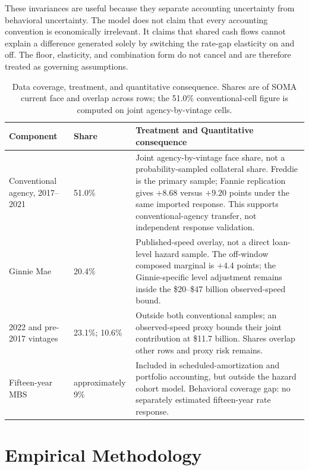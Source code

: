 These invariances are useful because they separate accounting uncertainty from behavioral uncertainty. The model does not claim that every accounting convention is economically irrelevant. It claims that shared cash flows cannot explain a difference generated solely by switching the rate-gap elasticity on and off. The floor, elasticity, and combination form do not cancel and are therefore treated as governing assumptions.

\begin{table}[H]
\centering
\small
\caption{Data coverage, treatment, and quantitative consequence. Shares are of SOMA current face and overlap across rows; the 51.0\% conventional-cell figure is computed on joint agency-by-vintage cells.}
\label{tab:coverage}\label{tab:bases}
\begin{tabular}{@{}p{3.1cm}p{2.3cm}p{9.3cm}@{}}
\toprule
Component & Share & Treatment and Quantitative consequence \\
\midrule
Conventional agency, 2017--2021 & 51.0\% & Joint agency-by-vintage face share, not a probability-sampled collateral share. Freddie is the primary sample; Fannie replication gives $+8.68$ versus $+9.20$ points under the same imported response. This supports conventional-agency transfer, not independent response validation. \\
Ginnie Mae & 20.4\% & Published-speed overlay, not a direct loan-level hazard sample. The off-window composed marginal is $+4.4$ points; the Ginnie-specific level adjustment remains inside the \$20--\$47 billion observed-speed bound. \\
2022 and pre-2017 vintages & 23.1\%; 10.6\% & Outside both conventional samples; an observed-speed proxy bounds their joint contribution at \$11.7 billion. Shares overlap other rows and proxy risk remains. \\
Fifteen-year MBS & approximately 9\% & Included in scheduled-amortization and portfolio accounting, but outside the hazard cohort model. Behavioral coverage gap: no separately estimated fifteen-year rate response. \\
\bottomrule
\end{tabular}
\end{table}

\section{Empirical Methodology}\label{sec:model}\label{sec:method-estimators}\label{sec:hazard}\label{sec:hazard-motivation}\label{sec:pathb}

